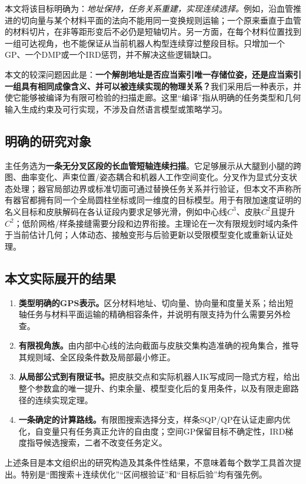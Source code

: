 \documentclass[UTF8,11pt,a4paper,fontset=fandol]{ctexart}
\numberwithin{equation}{section}
\theoremstyle{definition}
\begin{document}
本文将该目标明确为：\emph{地址保持，任务关系重建，实现连续选择。}例如，沿血管推进的切向量与某个材料平面的法向不能用同一变换规则运输；一个原来垂直于血管的材料切片，在非等距形变后不必仍是短轴切片。另一方面，在每个材料位置找到一组可达视角，也不能保证从当前机器人构型连续穿过整段目标。只增加一个GP、一个DMP或一个IRD惩罚，并不解决这些逻辑缺口。

本文的较深问题因此是：\textbf{一个解剖地址是否应当索引唯一存储位姿，还是应当索引一组具有相同成像含义、并可以被连续实现的物理关系？}我们采用后一种表示，并使它能够被编译为有限可检验的扫描走廊。这里“编译”指从明确的任务类型和几何输入生成约束及可行实现，不涉及自然语言模型或策略学习。

\subsection{明确的研究对象}
主任务选为\textbf{一条无分叉区段的长血管短轴连续扫描}。它足够展示从大腿到小腿的跨图、曲率变化、声束位置/姿态耦合和机器人工作空间变化。分叉作为显式分支状态处理；器官局部边界或标准切面可通过替换任务关系并行验证，但本文不声称所有器官都拥有同一个全局圆柱坐标或同一维度的目标模型。用于有限加速度证明的名义目标和皮肤解码在各认证段内要求足够光滑，例如中心线$C^3$、皮肤$C^2$且提升$C^2$；低阶网格/样条接缝需要分段和边界衔接。主理论在一次有限规划时域内条件于当前估计几何；人体动态、接触变形与后验更新以受限模型变化或重新认证处理。

\subsection{本文实际展开的结果}
\begin{enumerate}
\item \textbf{类型明确的GPS表示。}区分材料地址、切向量、协向量和度量关系；给出短轴任务与材料平面运输的精确相容条件，并说明有限支持为什么需要另外检查。
\item \textbf{有限视角族。}由内部中心线的法向截面与皮肤交集构造准确的视角集合，推导其规则域、全区段条件数及局部最小修正。
\item \textbf{从局部公式到有限证书。}把皮肤交点和实际机器人IK写成同一隐式方程，给出整个参数盒的唯一提升、约束余量、模型变化后的复用条件，以及有限走廊路径的连续实现定理。
\item \textbf{一条确定的计算路线。}有限图搜索选择分支，样条SQP/QP在认证走廊内优化，自变量只有任务真正允许的自由度；空间GP保留目标不确定性，IRD梯度指导候选搜索，二者不改变任务定义。
\end{enumerate}
上述条目是本文组织出的研究构造及其条件性结果，不意味着每个数学工具首次提出。特别是“图搜索＋连续优化”“区间根验证”和“目标后验”均有强先例。
\end{document}
